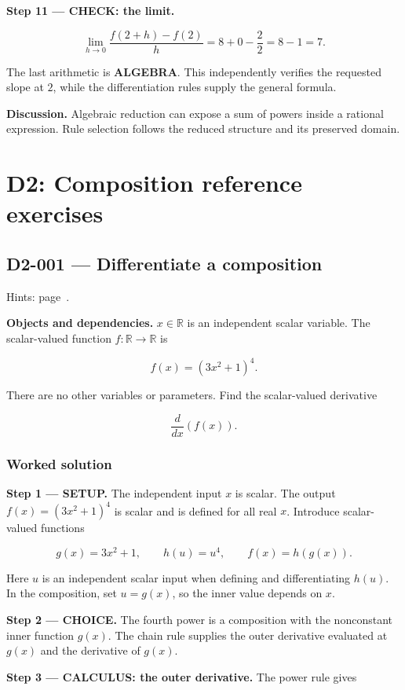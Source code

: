 \documentclass[11pt,oneside,openany]{book}
\begin{document}
\endgroup
\textbf{Step 11 --- CHECK: the limit.}

\[
\lim_{h\to0}\frac{f(2+h)-f(2)}h
=8+0-\frac22=8-1=7.
\]

The last arithmetic is \textbf{ALGEBRA}. This independently verifies the requested
slope at \(2\), while the differentiation rules supply the general formula.

\textbf{Discussion.} Algebraic reduction can expose a sum of powers inside a rational
expression. Rule selection follows the reduced structure and its preserved domain.

\chapter{D2: Composition reference exercises}
\markright{}
\section{D2-001 --- Differentiate a composition}
\label{problem:D2-001}
{\small Hints: page~\pageref{hints:D2-001}.}\par\medskip

\textbf{Objects and dependencies.} \(x\in\mathbb R\) is an independent scalar variable. The scalar-valued function \(f:\mathbb R\to\mathbb R\) is

\[
f(x)=(3x^2+1)^4.
\]

There are no other variables or parameters. Find the scalar-valued derivative

\[
\frac{d}{dx}\left(f(x)\right).
\]
\subsection*{Worked solution}

\textbf{Step 1 --- SETUP.} The independent input \(x\) is scalar. The output \(f(x)=(3x^2+1)^4\) is scalar and is defined for all real \(x\). Introduce scalar-valued functions

\[
g(x)=3x^2+1,\qquad h(u)=u^4,\qquad f(x)=h(g(x)).
\]

Here \(u\) is an independent scalar input when defining and differentiating \(h(u)\). In the composition, set \(u=g(x)\), so the inner value depends on \(x\).

\begin{ChoiceStep}
\textbf{Step 2 --- CHOICE.} The fourth power is a composition with the nonconstant inner function \(g(x)\). The chain rule supplies the outer derivative evaluated at \(g(x)\) and the derivative of \(g(x)\).

\end{ChoiceStep}
\textbf{Step 3 --- CALCULUS: the outer derivative.} The power rule gives
\end{document}
